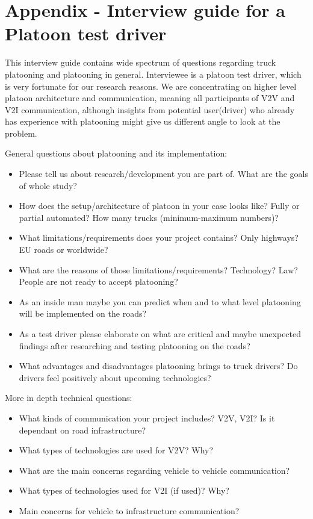 \appendix
\section{Appendix - Interview guide for a Platoon test driver}

This interview guide contains wide spectrum of questions regarding truck platooning and platooning in general. Interviewee is a platoon test driver, which is very fortunate for our research reasons. We are concentrating on higher level platoon architecture and communication, meaning all participants of V2V and V2I communication, although insights from potential user(driver) who already has experience with platooning might give us different angle to look at the problem.\par
% 
General questions about platooning and its implementation:
\begin{itemize}[noitemsep]
    \item Please tell us about research/development you are part of. What are the goals of whole study?
    \item How does the setup/architecture of platoon in your case looks like? Fully or partial automated? How many trucks (minimum-maximum numbers)?
    \item What limitations/requirements does your project contains? Only highways? EU roads or worldwide? 
    \item What are the reasons of those limitations/requirements? Technology? Law? People are not ready to accept platooning?
    \item As an inside man maybe you can predict when and to what level platooning will be implemented on the roads? \\
    \item As a test driver please elaborate on what are critical and maybe unexpected findings after researching and testing platooning on the roads?
    \item What advantages and disadvantages platooning brings to truck drivers? Do drivers feel positively about upcoming technologies?
\end{itemize}
%
\par
%
More in depth technical questions:
\begin{itemize}[noitemsep]
    \item What kinds of communication your project includes? V2V, V2I? Is it dependant on road infrastructure?
    \item What types of technologies are used for V2V? Why?
    \item What are the main concerns regarding vehicle to vehicle communication?
    \item What types of technologies used for V2I (if used)? Why?
    \item Main concerns for vehicle to infrastructure communication?
\end{itemize}